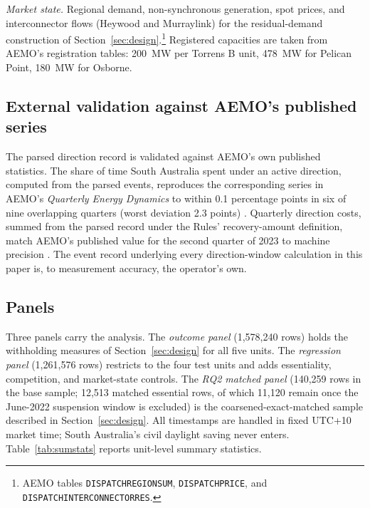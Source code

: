 \emph{Market state.} Regional demand, non-synchronous generation, spot
prices, and interconnector flows (Heywood and Murraylink) for the
residual-demand construction of Section~\ref{sec:design}.\footnote{AEMO
tables \texttt{DISPATCHREGIONSUM}, \texttt{DISPATCHPRICE}, and
\texttt{DISPATCHINTERCONNECTORRES}.} Registered capacities are taken from AEMO's
registration tables: 200~MW per Torrens B unit, 478~MW for Pelican Point,
180~MW for Osborne.

\subsection{External validation against AEMO's published series}

The parsed direction record is validated against AEMO's own published
statistics. The share of time South Australia spent under an active direction,
computed from the parsed events, reproduces the corresponding series in AEMO's
\emph{Quarterly Energy Dynamics} to within 0.1 percentage points in six of nine
overlapping quarters (worst deviation 2.3 points) \citep{AEMO2024_qed_q2}.
Quarterly direction costs, summed from the parsed record under the Rules'
recovery-amount definition, match AEMO's published value for the second
quarter of 2023 to machine precision \citep{AEMO2024_qed_q2}. The event record underlying every direction-window calculation in
this paper is, to measurement accuracy, the operator's own.

\subsection{Panels}

Three panels carry the analysis. The \emph{outcome panel} (1,578,240 rows)
holds the withholding measures of Section~\ref{sec:design} for all five units.
The \emph{regression panel} (1,261,576 rows) restricts to the four test units
and adds essentiality, competition, and market-state controls. The \emph{RQ2
matched panel} (140,259 rows in the base sample; 12,513 matched essential
rows, of which 11,120 remain once the June-2022 suspension window is
excluded) is the coarsened-exact-matched
sample described in Section~\ref{sec:design}. All timestamps are handled in
fixed UTC+10 market time; South Australia's civil daylight saving never enters.
Table~\ref{tab:sumstats} reports unit-level summary statistics.


